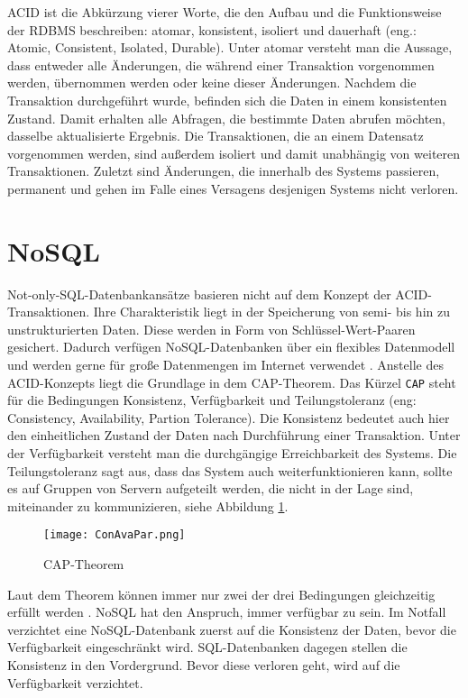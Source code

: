 ACID ist die Abkürzung vierer Worte, die den Aufbau und die Funktionsweise der RDBMS beschreiben: atomar, konsistent, isoliert und dauerhaft (eng.: Atomic, Consistent, Isolated, Durable). 
Unter atomar versteht man die Aussage, dass entweder alle Änderungen, die während einer Transaktion vorgenommen werden, übernommen werden oder keine dieser Änderungen. Nachdem die Transaktion durchgeführt wurde, befinden sich die Daten in einem konsistenten Zustand. Damit erhalten alle Abfragen, die bestimmte Daten abrufen möchten, dasselbe aktualisierte Ergebnis. Die Transaktionen, die an einem Datensatz vorgenommen werden, sind außerdem isoliert und damit unabhängig von weiteren Transaktionen. Zuletzt sind Änderungen, die innerhalb des Systems passieren, permanent und gehen im Falle eines Versagens desjenigen Systems nicht verloren.


\section{NoSQL}

Not-only-SQL-Datenbankansätze basieren nicht auf dem Konzept der ACID-Transaktionen. Ihre Charakteristik liegt in der Speicherung von semi- bis hin zu unstrukturierten Daten. Diese werden in Form von Schlüssel-Wert-Paaren gesichert. Dadurch verfügen NoSQL-Datenbanken über ein flexibles Datenmodell und werden gerne für große Datenmengen im Internet verwendet \cite[S.13]{zwei}. Anstelle des ACID-Konzepts liegt die Grundlage in dem CAP-Theorem.
Das Kürzel \texttt{CAP} steht für die Bedingungen Konsistenz, Verfügbarkeit und Teilungstoleranz (eng: Consistency, Availability, Partion Tolerance). Die Konsistenz bedeutet auch hier den einheitlichen Zustand der Daten nach Durchführung einer Transaktion. Unter der Verfügbarkeit versteht man die durchgängige Erreichbarkeit des Systems. Die Teilungstoleranz sagt aus, dass das System auch weiterfunktionieren kann, sollte es auf Gruppen von Servern aufgeteilt werden, die nicht in der Lage sind, miteinander zu kommunizieren, siehe Abbildung \ref{img:ConAvaPar}. 

\begin{figure}[!htb]
    \centering
    \texttt{[image: ConAvaPar.png]}
    \caption{CAP-Theorem \cite{drei}}
    \label{img:ConAvaPar}
\end{figure}

Laut dem Theorem können immer nur zwei der drei Bedingungen gleichzeitig erfüllt werden \cite[S.15f]{zwei}. NoSQL hat den Anspruch, immer verfügbar zu sein. Im Notfall verzichtet eine NoSQL-Datenbank zuerst auf die Konsistenz der Daten, bevor die Verfügbarkeit eingeschränkt wird. SQL-Datenbanken dagegen stellen die Konsistenz in den Vordergrund. Bevor diese verloren geht, wird auf die Verfügbarkeit verzichtet.

